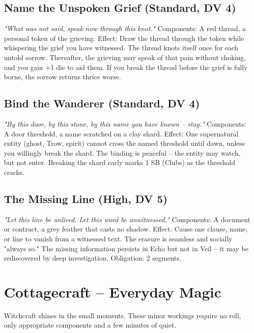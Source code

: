 \documentclass[10pt,a5paper]{book}
\begin{document}
\subsection*{Name the Unspoken Grief (Standard, DV 4)}
\textit{"What was not said, speak now through this knot."}
Components: A red thread, a personal token of the grieving.
Effect: Draw the thread through the token while whispering the grief you have witnessed. The thread knots itself once for each untold sorrow. Thereafter, the grieving may speak of that pain without choking, and you gain +1 die to aid them. If you break the thread before the grief is fully borne, the sorrow returns thrice worse.

\subsection*{Bind the Wanderer (Standard, DV 4)}
\textit{"By this door, by this stone, by this name you have known -- stay."}
Components: A door threshold, a name scratched on a clay shard.
Effect: One supernatural entity (ghost, Trow, spirit) cannot cross the named threshold until dawn, unless you willingly break the shard. The binding is peaceful -- the entity may watch, but not enter. Breaking the shard early marks 1 SB (Clubs) as the threshold cracks.

\subsection*{The Missing Line (High, DV 5)}
\textit{"Let this line be unlived. Let this word be unwitnessed."}
Components: A document or contract, a grey feather that casts no shadow.
Effect: Cause one clause, name, or line to vanish from a witnessed text. The erasure is seamless and socially "always so." The missing information persists in Echo but not in Veil -- it may be rediscovered by deep investigation. Obligation: 2 segments.

\section{Cottagecraft -- Everyday Magic}

Witchcraft shines in the small moments. These minor workings require no roll, only appropriate components and a few minutes of quiet.
\end{document}
